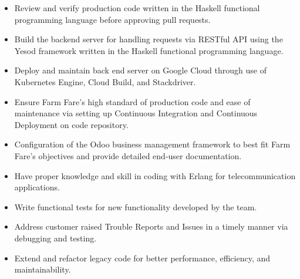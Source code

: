 \documentclass[10pt,a4paper]{altacv}
\begin{document}
\medskip

\divider

\small{
\begin{itemize}
\item Review and verify production code written in the Haskell functional programming language before approving pull requests.

\item Build the backend server for handling requests via RESTful API using the Yesod framework written in the Haskell functional programming language.

\item Deploy and maintain back end server on Google Cloud through use of Kubernetes Engine, Cloud Build, and Stackdriver.

\item Ensure Farm Fare's high standard of production code and ease of maintenance via setting up Continuous Integration and Continuous Deployment on code repository. 

\item Configuration of the Odoo business management framework to best fit Farm Fare's objectives and provide detailed end-user documentation.

\end{itemize}
}

\medskip

\divider

\small{
\begin{itemize}
\item Have proper knowledge and skill in coding with Erlang for telecommunication applications.

\item Write functional tests for new functionality developed by the team.

\item Address customer raised Trouble Reports and Issues in a timely manner via debugging and testing.

\item Extend and refactor legacy code for better performance, efficiency, and maintainability.

\end{itemize}
}

\clearpage
\end{document}
